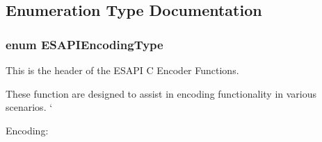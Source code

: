 \subsection{Enumeration Type Documentation}
\hypertarget{a00009_af4b9f1c8f83fc1f697a6c6fb2ba5749c}{
\subsubsection[{ESAPIEncodingType}]{\setlength{\rightskip}{0pt plus 5cm}enum {\bf ESAPIEncodingType}}}
\label{da/da0/a00009_af4b9f1c8f83fc1f697a6c6fb2ba5749c}


This is the header of the ESAPI C Encoder Functions. 

These function are designed to assist in encoding functionality in various scenarios. ` \par
 Encoding:


